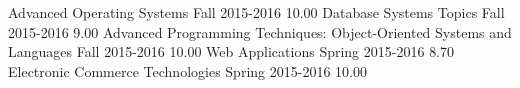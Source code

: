 \begin{grades}
    \begin{gradesgrouping}[Fall 2015-2016]
            {Advanced Operating Systems}
            {Fall}
            {2015-2016}
            {10.00}
            {Database Systems Topics}
            {Fall}
            {2015-2016}
            {9.00}
            {Advanced Programming Techniques: Object-Oriented Systems and Languages}
            {Fall}
            {2015-2016}
            {10.00}
          {Web Applications}
          {Spring}
          {2015-2016}
          {8.70}
          {Electronic Commerce Technologies}
          {Spring}
          {2015-2016}
          {10.00}
    \end{gradesgrouping}
\end{grades}
